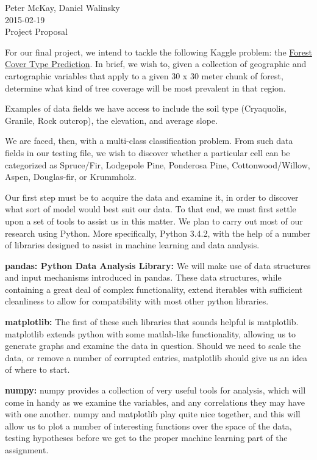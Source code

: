 \documentclass{article}
\begin{document}
\begin{center}
Peter McKay, Daniel Walinsky\\
2015-02-19\\
\Large Project Proposal
\end{center}

\bigskip
For our final project, we intend to tackle the following Kaggle problem:
the 
\href{http://www.kaggle.com/c/forest-cover-type-prediction}{Forest Cover Type Prediction}.
In brief, we wish to, given a collection of geographic and cartographic 
variables that apply to a given 30 x 30 meter chunk of forest, determine 
what kind of tree coverage will be most prevalent in that region.

Examples of data fields we have access to include the soil type 
(Cryaquolis, Granile, Rock outcrop), the elevation, and average slope.

We are faced, then, with a multi-class classification problem. From such 
data fields in our testing file, we wish to discover whether a 
particular cell can be categorized as
Spruce/Fir,
Lodgepole Pine,
Ponderosa Pine,
Cottonwood/Willow,
Aspen,
Douglas-fir, or
Krummholz.


Our first step must be to acquire the data and examine it, in order to 
discover what sort of model would best suit our data.  To that end, we 
must first settle upon a set of tools to assist us in this matter.  
We plan to carry out most of our research using Python.  More 
specifically, Python 3.4.2, with the help of a number of libraries designed 
to assist in machine learning and data analysis.  

\textbf{pandas: Python Data Analysis Library:}
We will make use of data structures and input mechanisms introduced in 
pandas.  These data structures, while containing a great deal of 
complex functionality, extend iterables with sufficient cleanliness to 
allow for compatibility with most other python libraries.

\textbf{matplotlib:} 
The first of these such libraries that sounds helpful is matplotlib.  
matplotlib extends python with some matlab-like functionality, allowing 
us to generate graphs and examine the data in question.  Should we need 
to scale the data, or remove a number of corrupted entries, matplotlib 
should give us an idea of where to start.

\textbf{numpy:}
numpy provides a collection of very useful tools for analysis, which 
will come in handy as we examine the variables, and any correlations 
they may have with one another.  numpy and matplotlib play quite nice 
together, and this will allow us to plot a number of interesting 
functions over the space of the data, testing hypotheses before we get 
to the proper machine learning part of the assignment.
\end{document}
